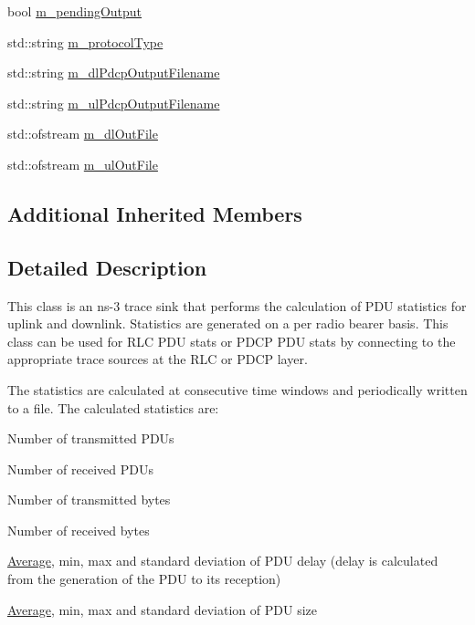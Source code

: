 \begin{DoxyCompactItemize}
bool \hyperlink{classns3_1_1MmWaveBearerStatsCalculator_a3ede9e9051e428f46247b32a7bda5740}{m\+\_\+pending\+Output}
\item 
std\+::string \hyperlink{classns3_1_1MmWaveBearerStatsCalculator_a54f9641216abff9a514e593086dd718f}{m\+\_\+protocol\+Type}
\item 
std\+::string \hyperlink{classns3_1_1MmWaveBearerStatsCalculator_abf193f671ade3c7a7aa42e57a4e8fc29}{m\+\_\+dl\+Pdcp\+Output\+Filename}
\item 
std\+::string \hyperlink{classns3_1_1MmWaveBearerStatsCalculator_a68cd58ed09f2f081e6af8486893e2fa6}{m\+\_\+ul\+Pdcp\+Output\+Filename}
\item 
std\+::ofstream \hyperlink{classns3_1_1MmWaveBearerStatsCalculator_a99423ed4357c6877a7fade9e721d3b1f}{m\+\_\+dl\+Out\+File}
\item 
std\+::ofstream \hyperlink{classns3_1_1MmWaveBearerStatsCalculator_ab21257dfc9d424a270882b7f0b906f7c}{m\+\_\+ul\+Out\+File}
\end{DoxyCompactItemize}
\subsection*{Additional Inherited Members}


\subsection{Detailed Description}
This class is an ns-\/3 trace sink that performs the calculation of P\+DU statistics for uplink and downlink. Statistics are generated on a per radio bearer basis. This class can be used for R\+LC P\+DU stats or P\+D\+CP P\+DU stats by connecting to the appropriate trace sources at the R\+LC or P\+D\+CP layer.

The statistics are calculated at consecutive time windows and periodically written to a file. The calculated statistics are\+:


\begin{DoxyItemize}
\item Number of transmitted P\+D\+Us
\item Number of received P\+D\+Us
\item Number of transmitted bytes
\item Number of received bytes
\item \hyperlink{classns3_1_1Average}{Average}, min, max and standard deviation of P\+DU delay (delay is calculated from the generation of the P\+DU to its reception)
\item \hyperlink{classns3_1_1Average}{Average}, min, max and standard deviation of P\+DU size 
\end{DoxyItemize}

